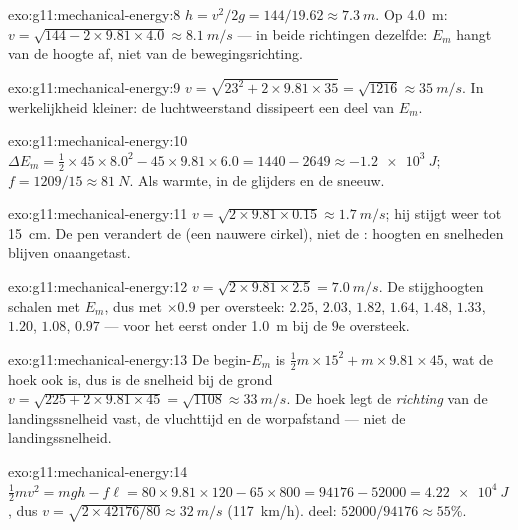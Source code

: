 \begin{solution}{exo:g11:mechanical-energy:8}
$h = v^2/2g = 144/19.62 \approx \qty{7.3}{m}$. Op \qty{4.0}{m}:
$v = \sqrt{144 - 2 \times 9.81 \times 4.0} \approx \qty{8.1}{m/s}$ ---
in beide richtingen dezelfde: $E_m$ hangt van de hoogte af, niet van de
bewegingsrichting.
\end{solution}

\begin{solution}{exo:g11:mechanical-energy:9}
$v = \sqrt{23^2 + 2 \times 9.81 \times 35} = \sqrt{1216} \approx
\qty{35}{m/s}$. In werkelijkheid kleiner: de luchtweerstand dissipeert
een deel van $E_m$.
\end{solution}

\begin{solution}{exo:g11:mechanical-energy:10}
$\Delta E_m = \tfrac12 \times 45 \times 8.0^2 - 45 \times 9.81 \times
6.0 = 1440 - 2649 \approx \qty{-1.2e3}{J}$;
$f = 1209/15 \approx \qty{81}{N}$. Als warmte, in de glijders en de
sneeuw.
\end{solution}

\begin{solution}{exo:g11:mechanical-energy:11}
$v = \sqrt{2 \times 9.81 \times 0.15} \approx \qty{1.7}{m/s}$; hij stijgt
weer tot \qty{15}{cm}. De pen verandert de  (een nauwere cirkel),
niet de : hoogten en snelheden blijven onaangetast.
\end{solution}

\begin{solution}{exo:g11:mechanical-energy:12}
$v = \sqrt{2 \times 9.81 \times 2.5} = \qty{7.0}{m/s}$. De stijghoogten
schalen met $E_m$, dus met $\times 0.9$ per oversteek: $2.25$, $2.03$,
$1.82$, $1.64$, $1.48$, $1.33$, $1.20$, $1.08$, $0.97$ --- voor het eerst
onder \qty{1.0}{m} bij de $9$e oversteek.
\end{solution}

\begin{solution}{exo:g11:mechanical-energy:13}
De begin-$E_m$ is $\tfrac12 m \times 15^2 + m \times 9.81 \times 45$,
wat de hoek ook is, dus is de snelheid bij de grond
$v = \sqrt{225 + 2 \times 9.81 \times 45} = \sqrt{1108} \approx
\qty{33}{m/s}$. De hoek legt de \emph{richting} van de landingssnelheid
vast, de vluchttijd en de worpafstand --- niet de landingssnelheid.
\end{solution}

\begin{solution}{exo:g11:mechanical-energy:14}
$\tfrac12 mv^2 = mgh - f\ell = 80 \times 9.81 \times 120 - 65 \times
800 = \num{94176} - \num{52000} = \qty{4.22e4}{J}$, dus
$v = \sqrt{2 \times \num{42176}/80} \approx \qty{32}{m/s}$
(\qty{117}{km/h}).  deel: $52000/94176 \approx 55\%$.
\end{solution}

